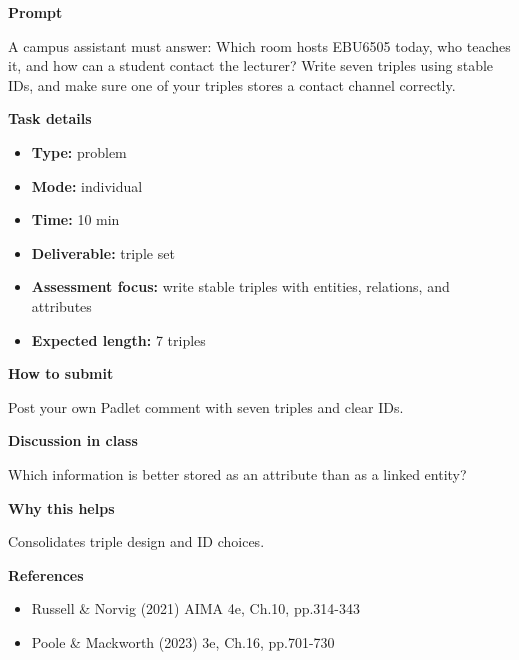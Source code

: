 \documentclass[11pt]{article}
\begin{document}
\begin{tcolorbox}[colback=white,colframe=MidnightBlue,title={Q3 Knowledge Representation with IDs},fonttitle=\bfseries,breakable]
\begin{center}
\end{center}

{\large\bfseries\color{MidnightBlue} Prompt}\par\medskip
A campus assistant must answer: Which room hosts EBU6505 today, who teaches it, and how can a student contact the lecturer? Write seven triples using stable IDs, and make sure one of your triples stores a contact channel correctly.

{\large\bfseries\color{MidnightBlue} Task details}\par\medskip
\begin{itemize}\item \textbf{Type:} problem
\item \textbf{Mode:} individual
\item \textbf{Time:} 10 min
\item \textbf{Deliverable:} triple set
\item \textbf{Assessment focus:} write stable triples with entities, relations, and attributes
\item \textbf{Expected length:} 7 triples\end{itemize}

{\large\bfseries\color{MidnightBlue} How to submit}\par\medskip
Post your own Padlet comment with seven triples and clear IDs.

{\large\bfseries\color{MidnightBlue} Discussion in class}\par\medskip
Which information is better stored as an attribute than as a linked entity?

{\large\bfseries\color{MidnightBlue} Why this helps}\par\medskip
Consolidates triple design and ID choices.

{\large\bfseries\color{MidnightBlue} References}\par\medskip
\begin{itemize}\item Russell \& Norvig (2021) AIMA 4e, Ch.10, pp.314-343
\item Poole \& Mackworth (2023) 3e, Ch.16, pp.701-730\end{itemize}
\end{tcolorbox}
\end{document}
